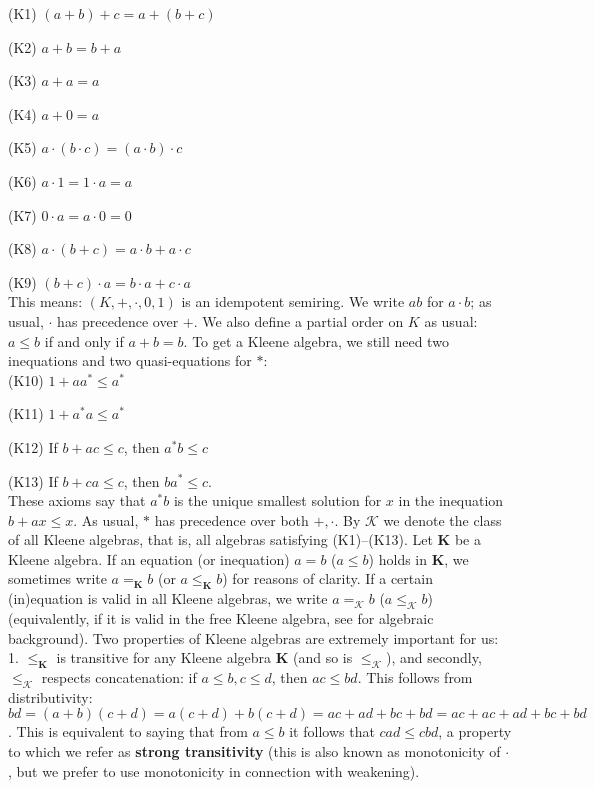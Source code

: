 \documentclass{eptcs}
\newcommand{\KA}{\mathcal{K}}
\begin{document}
(K1) $(a+b)+c=a+(b+c)$

(K2) $a+b=b+a$

(K3) $a+a=a$

(K4) $a+0=a$

(K5) $a\cdot(b\cdot c)=(a\cdot b)\cdot c$

(K6) $a\cdot 1=1\cdot a=a$

(K7) $0\cdot a=a\cdot 0=0$

(K8) $a\cdot(b+c)=a\cdot b+a\cdot c$

(K9) $(b+c)\cdot a=b\cdot a+c\cdot a$
\\

This means: $(K,+,\cdot,0,1)$ is an idempotent semiring. We write $ab$ for
$a\cdot b$; as usual, $\cdot$ has precedence over $+$. 
 We also define a partial order
on $K$ as usual: $a\leq b$ if and only if $a+b=b$.
To get a Kleene algebra, we still need two inequations and two 
quasi-equations for $*$:
\\

(K10) $1+aa^*\leq a^*$

(K11) $1+a^*a\leq a^*$

(K12) If $b+ac\leq c$, then $a^*b\leq c$

(K13) If $b+ca\leq c$, then $ba^*\leq c$.
\\

These axioms say that $a^*b$ is the unique smallest solution for $x$
in the inequation $b+ax\leq x$. As usual, $*$ has precedence over 
both $+,\cdot$. By $\KA$ we denote the class of
all Kleene algebras, that is, all algebras satisfying 
(K1)--(K13). Let $\textbf{K}$ be a Kleene algebra. If an equation
(or inequation) $a=b$ ($a\leq b$) holds in $\textbf{K}$, we sometimes
write $a=_\textbf{K}b$ (or $a\leq_\textbf{K} b$) for reasons of clarity.
If a certain (in)equation is valid in all Kleene algebras, we write
$a=_\KA b$ ($a\leq_\KA b$) (equivalently, if it is valid in the free
Kleene algebra, see \cite{burris} for algebraic background).
 Two properties of Kleene algebras are extremely
important for us: 1. $\leq_\textbf{K}$ is transitive
for any Kleene algebra $\textbf{K}$ (and so is $\leq_\KA$), and secondly, $\leq_\KA$
respects concatenation: if 
$a\leq b,c\leq d$, then $ac\leq bd$. This follows from distributivity:
$bd=(a+b)(c+d)=a(c+d)+b(c+d)=ac+ad+bc+bd=ac+ac+ad+bc+bd$. This is 
equivalent to saying that from $a\leq b$ it follows that $cad\leq cbd$,
a property to which we refer as \textbf{strong transitivity}
(this is also known as monotonicity of $\cdot$, but we prefer to use
monotonicity in connection with weakening).
\end{document}
